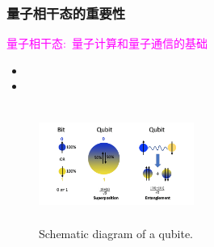 \begin{frame}
    \frametitle{量子相干态的重要性}
    \textcolor{magenta}{量子相干态:~量子计算和量子通信的基础}
    \begin{itemize}
        \item {\fontsize{8.5pt}{5.2pt}\selectfont{量子计算:~并行计算正是利用相干态的叠加特性实现的}}
	\item {\fontsize{8.5pt}{5.2pt}\selectfont{量子信息处理:~相干态的保持可确保信息的准确传输和处理}}
    \end{itemize}
{\fontsize{7.5pt}{5.2pt}}
            \begin{figure}
        \centering
                \includegraphics[height=1.5in, width=2.0in, viewport=0 0 460 380,clip]{Figures/Illustration-of-a-bit_and_qubit.png}
		\caption{\tiny{\textrm{Schematic diagram of a qubite.}}}
		\label{Fig:Schematic-Coherence-of-particle}
            \end{figure}
\end{frame}

